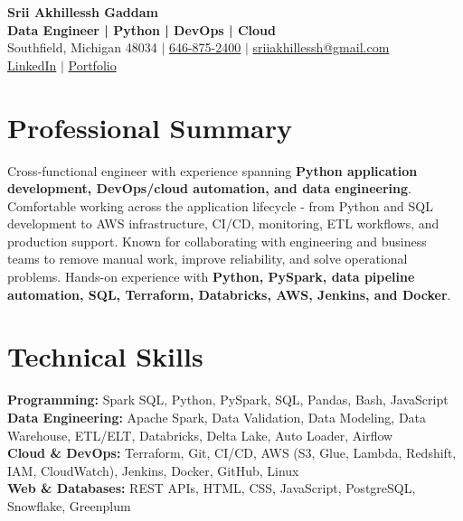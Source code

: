 \documentclass[letterpaper,10pt]{article}
\begin{document}
\fontsize{9.35pt}{10.45pt}\selectfont

\begin{center}
    {\LARGE \textbf{Srii Akhillessh Gaddam}} \\[-1pt]
    \textbf{Data Engineer | Python | DevOps | Cloud} \\[2pt]
    Southfield, Michigan 48034 $|$
    \href{tel:6468752400}{646-875-2400} $|$
    \href{mailto:sriiakhillessh@gmail.com}{sriiakhillessh@gmail.com} \\[1pt]
    \href{https://www.linkedin.com/in/srii-akhiilessh-gaddam-b48668191/}{LinkedIn} $|$
    \href{https://sriiakhillesshg.github.io/portfolio/}{Portfolio}
\end{center}
\vspace{-8pt}

\section{Professional Summary}
\small{Cross-functional engineer with experience spanning \textbf{Python application development, DevOps/cloud automation, and data engineering}. Comfortable working across the application lifecycle - from Python and SQL development to AWS infrastructure, CI/CD, monitoring, ETL workflows, and production support. Known for collaborating with engineering and business teams to remove manual work, improve reliability, and solve operational problems. Hands-on experience with \textbf{Python, PySpark, data pipeline automation, SQL, Terraform, Databricks, AWS, Jenkins, and Docker}.}

\section{Technical Skills}
\small{
\textbf{Programming:} Spark SQL, Python, PySpark, SQL, Pandas, Bash, JavaScript \\
\textbf{Data Engineering:} Apache Spark, Data Validation, Data Modeling, Data Warehouse, ETL/ELT, Databricks, Delta Lake, Auto Loader, Airflow \\
\textbf{Cloud \& DevOps:} Terraform, Git, CI/CD, AWS (S3, Glue, Lambda, Redshift, IAM, CloudWatch), Jenkins, Docker, GitHub, Linux \\
\textbf{Web \& Databases:} REST APIs, HTML, CSS, JavaScript, PostgreSQL, Snowflake, Greenplum
}
\end{document}
